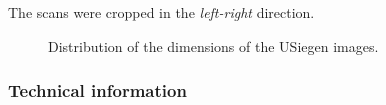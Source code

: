 The scans were cropped in the \textit{left-right} direction. 

\begin{SCfigure}[][htb]
    \centering
    
    \caption{Distribution of the dimensions of the USiegen images. \label{fig:USiegen_Dims}}
\end{SCfigure}

\subsubsection{Technical information}


